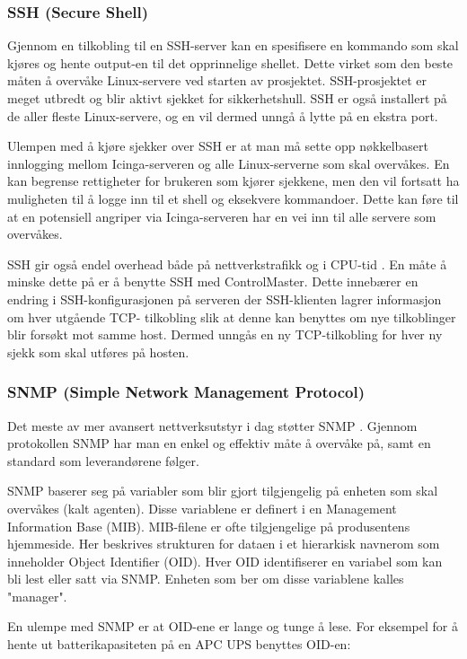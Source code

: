 \subsubsection{SSH (Secure Shell)}
Gjennom en tilkobling til en SSH-server kan en spesifisere en kommando som skal kjøres og hente output-en til det opprinnelige shellet. Dette virket som den beste måten å overvåke Linux-servere ved starten av prosjektet. SSH-prosjektet er meget utbredt og blir aktivt sjekket for sikkerhetshull. SSH er også installert på de aller fleste Linux-servere, og en vil dermed unngå å lytte på en ekstra port.

Ulempen med å kjøre sjekker over SSH er at man må sette opp nøkkelbasert innlogging mellom Icinga-serveren og alle Linux-serverne som skal overvåkes. En kan begrense rettigheter for brukeren som kjører sjekkene, men den vil fortsatt ha muligheten til å logge inn til et shell og eksekvere kommandoer. Dette kan føre til at en potensiell angriper via Icinga-serveren har en vei inn til alle servere som overvåkes.

SSH gir også endel overhead både på nettverkstrafikk og i CPU-tid \cite{sshmanpage}. En måte å minske dette på er å benytte SSH med ControlMaster. Dette innebærer en endring i SSH-konfigurasjonen på serveren der SSH-klienten lagrer informasjon om hver utgående TCP- tilkobling slik at denne kan benyttes om nye tilkoblinger blir forsøkt mot samme host. Dermed unngås en ny TCP-tilkobling for hver ny sjekk som skal utføres på hosten.

\subsubsection{SNMP (Simple Network Management Protocol)}
Det meste av mer avansert nettverksutstyr i dag støtter SNMP \cite{essentialsnmp}. Gjennom protokollen SNMP har man en enkel og effektiv måte å overvåke på, samt en standard som leverandørene følger.
	
SNMP baserer seg på variabler som blir gjort tilgjengelig på enheten som skal overvåkes (kalt agenten). Disse variablene er definert i en Management Information Base (MIB). MIB-filene er ofte tilgjengelige på produsentens hjemmeside. Her beskrives strukturen for dataen i et hierarkisk navnerom som inneholder Object Identifier (OID). Hver OID identifiserer en variabel som kan bli lest eller satt via SNMP. Enheten som ber om disse variablene kalles "manager". 

En ulempe med SNMP er at OID-ene er lange og tunge å lese. For eksempel for å hente ut batterikapasiteten på en APC UPS benyttes OID-en:

